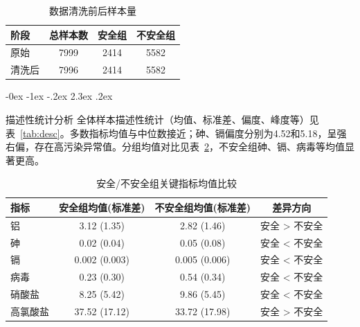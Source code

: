 \documentclass[12pt,a4paper]{ctexart}
\makeatletter
\renewcommand{\section}{\@startsection{section}{1}{\z@}%
{-0ex \@plus -1ex \@minus -.2ex}%
{2.3ex \@plus.2ex}%
{\normalfont\Large\bfseries\raggedright}}
\makeatother
\begin{document}
\begin{table}[H]
\centering
\caption{数据清洗前后样本量}
\label{tab:clean}
\begin{tabular}{lccc}
\toprule
阶段 & 总样本数 & 安全组 & 不安全组 \\
\midrule
原始 & 7999 & 2414 & 5582 \\
清洗后 & 7996 & 2414 & 5582 \\
\bottomrule
\end{tabular}
\end{table}

\section{描述性统计分析}
全体样本描述性统计（均值、标准差、偏度、峰度等）见表~\ref{tab:desc}。多数指标均值与中位数接近；砷、镉偏度分别为4.52和5.18，呈强右偏，存在高污染异常值。分组均值对比见表~\ref{tab:group}，不安全组砷、镉、病毒等均值显著更高。

\begin{table}[H]
\centering
\caption{安全/不安全组关键指标均值比较}
\label{tab:group}
\begin{tabular}{lccc}
\toprule
指标 & 安全组均值(标准差) & 不安全组均值(标准差) & 差异方向 \\
\midrule
铝 & 3.12 (1.35) & 2.82 (1.46) & 安全 > 不安全 \\
砷 & 0.02 (0.04) & 0.05 (0.08) & 安全 < 不安全 \\
镉 & 0.002 (0.003) & 0.005 (0.006) & 安全 < 不安全 \\
病毒 & 0.23 (0.30) & 0.54 (0.34) & 安全 < 不安全 \\
硝酸盐 & 8.25 (5.42) & 9.86 (5.45) & 安全 < 不安全 \\
高氯酸盐 & 37.52 (17.12) & 33.72 (17.98) & 安全 > 不安全 \\
\bottomrule
\end{tabular}
\end{table}
\end{document}
